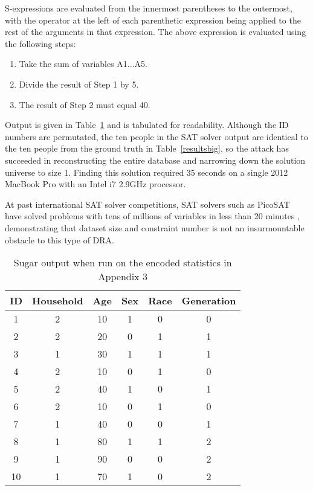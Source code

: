 \documentclass[runningheads]{llncs}
\begin{document}
S-expressions are evaluated from the innermost parentheses to the outermost, with the operator at the left of each parenthetic expression being applied to the rest of the arguments in that expression. The above expression is evaluated using the following steps:
\begin{enumerate}
    \item Take the sum of variables A1...A5.
    \item Divide the result of Step 1 by 5.
    \item The result of Step 2 must equal 40.
\end{enumerate}

Output is given in Table~\ref{sugarbig} and is tabulated for readability. Although the ID numbers are permutated, the ten people in the SAT solver output are identical to the ten people from the ground truth in Table~\ref{resultsbig}, so the attack has succeeded in reconstructing the entire database and narrowing down the solution universe to size 1. Finding this solution required 35 seconds on a single 2012 MacBook Pro with an Intel i7 2.9GHz processor.

At past international SAT solver competitions, SAT solvers such as PicoSAT have solved problems with tens of millions of variables in less than 20 minutes \cite{satcomp}, demonstrating that dataset size and constraint number is not an insurmountable obstacle to this type of DRA.

\begin{table}
\begin{tabular}{c|c|c|c|c|c}
ID & Household & Age & Sex & Race & Generation \\
\hline
1 & 2 & 10 & 1 & 0 & 0  \\
2 & 2 & 20 & 0 & 1 & 1  \\
3 & 1 & 30 & 1 & 1 & 1  \\
4 & 2 & 10 & 0 & 1 & 0  \\
5 & 2 & 40 & 1 & 0 & 1  \\
6 & 2 & 10 & 0 & 1 & 0  \\
7 & 1 & 40 & 0 & 0 & 1  \\
8 & 1 & 80 & 1 & 1 & 2  \\
9 & 1 & 90 & 0 & 0 & 2 \\
10 & 1 & 70 & 1 & 0 & 2 \\
\hline
\end{tabular}
\caption{Sugar output when run on the encoded statistics in Appendix 3}\label{sugarbig}
\end{table}
\end{document}
